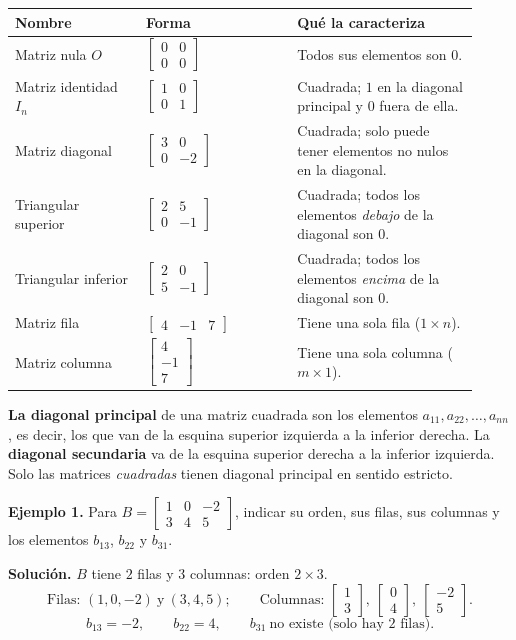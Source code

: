 \documentclass[12pt, letterpaper]{article}
\newcommand{\mwmat}[1]{\ensuremath{\begin{bmatrix}#1\end{bmatrix}}}
\begin{document}
\begin{center}
\small
\begin{tabular}{@{}p{0.26\linewidth} p{0.30\linewidth} p{0.36\linewidth}@{}}
  \toprule
  \textbf{Nombre} & \textbf{Forma} & \textbf{Qué la caracteriza} \\
  \midrule
  Matriz nula $O$ & $\mwmat{0&0\\0&0}$ &
    Todos sus elementos son $0$. \\[6pt]
  Matriz identidad $I_n$ & $\mwmat{1&0\\0&1}$ &
    Cuadrada; $1$ en la diagonal principal y $0$ fuera de ella. \\[6pt]
  Matriz diagonal & $\mwmat{3&0\\0&-2}$ &
    Cuadrada; solo puede tener elementos no nulos en la diagonal. \\[6pt]
  Triangular superior & $\mwmat{2&5\\0&-1}$ &
    Cuadrada; todos los elementos \emph{debajo} de la diagonal son $0$. \\[6pt]
  Triangular inferior & $\mwmat{2&0\\5&-1}$ &
    Cuadrada; todos los elementos \emph{encima} de la diagonal son $0$. \\[6pt]
  Matriz fila & $\mwmat{4 & -1 & 7}$ &
    Tiene una sola fila ($1\times n$). \\[6pt]
  Matriz columna & $\mwmat{4\\-1\\7}$ &
    Tiene una sola columna ($m\times1$). \\
  \bottomrule
\end{tabular}
\end{center}

\begin{cuadroextra}
  \small
  \textbf{La diagonal principal} de una matriz cuadrada son los elementos
  $a_{11},a_{22},\dots,a_{nn}$, es decir, los que van de la esquina superior
  izquierda a la inferior derecha. La \textbf{diagonal secundaria} va de la
  esquina superior derecha a la inferior izquierda. Solo las matrices
  \emph{cuadradas} tienen diagonal principal en sentido estricto.
\end{cuadroextra}

\begin{cuadrosolucion}
  \small
  \textbf{Ejemplo 1.} Para
  $B=\mwmat{1 & 0 & -2\\ 3 & 4 & 5}$, indicar su orden, sus filas, sus
  columnas y los elementos $b_{13}$, $b_{22}$ y $b_{31}$.

  \medskip
  \textbf{Solución.} $B$ tiene $2$ filas y $3$ columnas: orden $2\times3$.
  \[
    \text{Filas: } (1,0,-2)\ \text{y}\ (3,4,5);
    \qquad
    \text{Columnas: } \mwmat{1\\3},\ \mwmat{0\\4},\ \mwmat{-2\\5}.
  \]
  \[
    b_{13}=-2,\qquad b_{22}=4,\qquad b_{31}\ \text{no existe (solo hay 2 filas).}
  \]
\end{cuadrosolucion}
\end{document}
